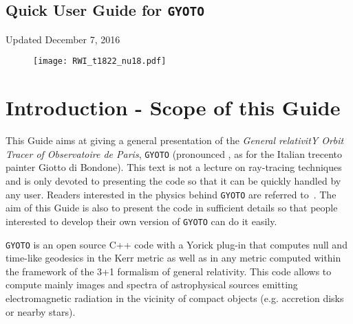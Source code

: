 \documentclass[a4paper,12pt]{article}
\begin{document}
\begin{center}
\section*{\Huge{Quick User Guide for \texttt{GYOTO}}}

\vspace{0.5cm}

\Large{Updated December 7, 2016}

\vspace{4cm}

\begin{figure}[htbp]
\centering
\texttt{[image: RWI\_t1822\_nu18.pdf]}
\end{figure}

\end{center}



\newpage

\section*{Introduction - Scope of this Guide}



This Guide aims at giving a general presentation of the \textit{General relativitY Orbit Tracer of Observatoire de Paris}, \texttt{GYOTO} (pronounced \textipa{[dZIoto]}, as for the Italian trecento painter Giotto di Bondone). This text is not a lecture on ray-tracing techniques and is only devoted to presenting the code so that it can be quickly handled by any user. Readers interested in the physics behind \texttt{GYOTO} are referred to~\citet[][and references therein]{vincent11a,vincent12a}. The aim of this Guide is also to present the code in sufficient details so that people interested to develop their own version of \texttt{GYOTO} can do it easily.

\texttt{GYOTO} is an open source C++ code with a Yorick plug-in that computes null and time-like geodesics in the Kerr metric as well as in any metric computed within the framework of the 3+1 formalism of general relativity. This code allows to compute mainly images and spectra of astrophysical sources emitting electromagnetic radiation in the vicinity of compact objects (e.g. accretion disks or nearby stars). 
\end{document}
